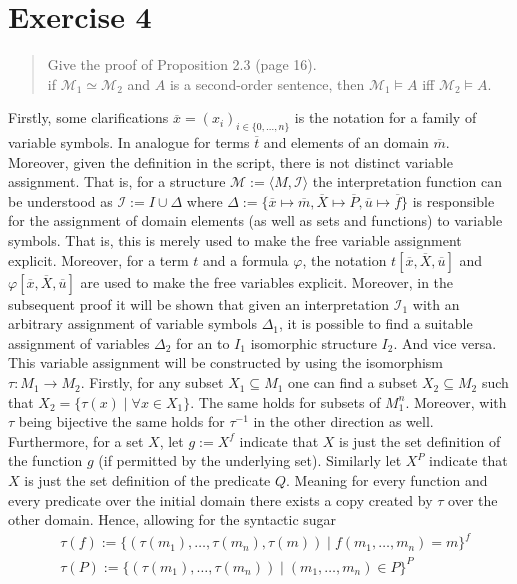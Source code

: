 \documentclass[11pt,a4paper]{article}
\begin{document}
\section*{Exercise 4}
\begin{quote}
Give the proof of Proposition 2.3 (page 16). \\
if $\mathcal{M}_1 \simeq \mathcal{M}_2$ and $ A$ is a second-order sentence, then $\mathcal{M}_1 \models A$ iff $\mathcal{M}_2 \models A$.
\end{quote}

Firstly, some clarifications $\overline{x}=(x_i)_{i \in \{0,\dots,n \}}$ is the notation for a family of variable symbols. In analogue for terms $\overline{t}$ and elements of an domain $\overline{m}$. Moreover, given the definition in the script, there is not distinct variable assignment. That is, for a structure $\mathcal{M}:= \langle M , \mathcal{I}\rangle$ the interpretation function can be understood as $\mathcal{I} := I \cup \Delta$ where $\Delta:= \{\overline{x} \mapsto \overline{m}, \overline{X} \mapsto \overline{P},\overline{u} \mapsto \overline{f}\}$ is responsible for the assignment of domain elements (as well as sets and functions) to variable symbols. That is, this is merely used to make the free variable assignment explicit.
Moreover, for a term $t$ and a formula $\varphi$, the notation $t[\overline{x},\overline{X},\overline{u}]$ and $\varphi[\overline{x},\overline{X},\overline{u}]$ are used to make the free variables explicit. Moreover, in the subsequent proof it will be shown that given an interpretation $\mathcal{I}_1$ with an arbitrary assignment of variable symbols $\Delta_1$, it is possible to find a suitable assignment of variables $\Delta_2$ for an to $I_1$ isomorphic structure $I_2$. And vice versa. This variable assignment will be constructed by using the isomorphism $\tau: M_1 \to M_2$.
Firstly, for any subset $X_1 \subseteq M_1$ one can find a subset $X_2 \subseteq M_2$ such that
 $X_2=\{ \tau(x) \mid \forall x \in X_1 \}$. The same holds for subsets of $M_1^n$. 
Moreover, with $\tau$ being bijective the same holds for $\tau^{-1}$ in the other direction as well. Furthermore, for a set $X$, let $g:=X^f$ indicate that $X$ is just the set definition of the function $g$ (if permitted by the underlying set). Similarly let $X^P$ indicate that $X$ is just the set definition of the predicate $Q$. Meaning for every function and every predicate over the initial domain there exists a copy created by $\tau$ over the other domain. Hence, allowing for  the syntactic sugar
\begin{equation*}
\begin{split}
&\tau(f):= \{(\tau(m_{1}) , \dots ,\tau( m_{n}), \tau(m)) \mid f(m_{1} , \dots , m_{n})=m\}^{f}\\
&\tau(P):= \{(\tau(m_{1}) , \dots ,\tau( m_{n})) \mid (m_{1} , \dots , m_{n}) \in P\}^{P}\\
\end{split}
\end{equation*}
\end{document}
